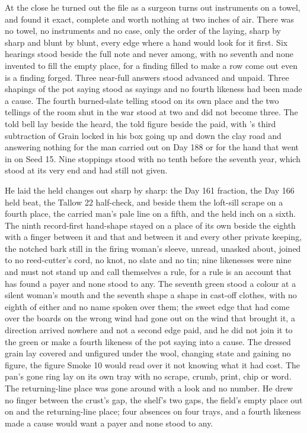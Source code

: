 At the close he turned out the file as a surgeon turns out instruments on a towel, and found it exact, complete and worth nothing at two inches of air. There was no towel, no instruments and no case, only the order of the laying, sharp by sharp and blunt by blunt, every edge where a hand would look for it first. Six hearings stood beside the full note and never among, with no seventh and none invented to fill the empty place, for a finding filled to make a row come out even is a finding forged. Three near-full answers stood advanced and unpaid. Three shapings of the pot saying stood as sayings and no fourth likeness had been made a cause. The fourth burned-slate telling stood on its own place and the two tellings of the room shut in the war stood at two and did not become three. The told bell lay beside the heard, the told figure beside the paid, with 's third subtraction of Grain locked in his box going up and down the clay road and answering nothing for the man carried out on Day 188 or for the hand that went in on Seed 15. Nine stoppings stood with no tenth before the seventh year, which stood at its very end and had still not given.

He laid the held changes out sharp by sharp: the Day 161 fraction, the Day 166 held beat, the Tallow 22 half-check, and beside them the loft-sill scrape on a fourth place, the carried man's pale line on a fifth, and the held inch on a sixth. The ninth record-first hand-shape stayed on a place of its own beside the eighth with a finger between it and that and between it and every other private keeping, the notched bark still in the firing woman's sleeve, unread, unasked about, joined to no reed-cutter's cord, no knot, no slate and no tin; nine likenesses were nine and must not stand up and call themselves a rule, for a rule is an account that has found a payer and none stood to any. The seventh green stood a colour at a silent woman's mouth and the seventh shape a shape in cast-off clothes, with no eighth of either and no name spoken over them; the sweet edge that had come over the boards on the wrong wind had gone out on the wind that brought it, a direction arrived nowhere and not a second edge paid, and he did not join it to the green or make a fourth likeness of the pot saying into a cause. The dressed grain lay covered and unfigured under the wool, changing state and gaining no figure, the figure Smoke 10 would read over it not knowing what it had cost. The pan's gone ring lay on its own tray with no scrape, crumb, print, chip or word. The returning-line place was gone around with a look and no number. He drew no finger between the crust's gap, the shelf's two gaps, the field's empty place out on  and the returning-line place; four absences on four trays, and a fourth likeness made a cause would want a payer and none stood to any.

